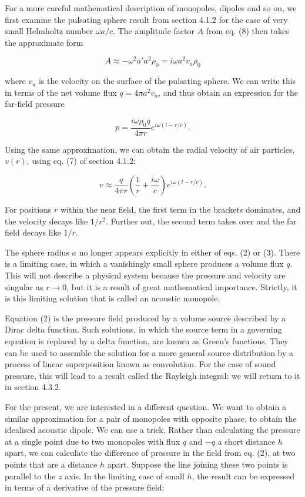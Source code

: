   For a more careful mathematical description of monopoles, dipoles and so on, 
  we first examine the pulsating sphere result from section 4.1.2 for the case 
  of very small Helmholtz number $\omega a/c$. The amplitude factor $A$ from 
  eq. (8) then takes the approximate form 

  $$A \approx -\omega^2 a' a^2 \rho_0 = i \omega a^2 v_a \rho_0 \tag{1}$$ 

  where $v_a$ is the velocity on the surface of the pulsating sphere. We can 
  write this in terms of the net volume flux $q=4 \pi a^2 v_a$, and thus obtain 
  an expression for the far-field pressure 

  $$p=\dfrac{i \omega \rho_0 q}{4 \pi r} e^{i \omega(t-r/c)} . \tag{2}$$ 

  Using the same approximation, we can obtain the radial velocity of air 
  particles, $v(r)$, using eq. (7) of section 4.1.2: 

  $$v \approx \dfrac{q}{4 \pi r} \left( \dfrac{1}{r} + \dfrac{i \omega}{c} 
  \right) e^{i \omega(t-r/c)} . \tag{3}$$ 

  For positions $r$ within the near field, the first term in the brackets 
  dominates, and the velocity decays like $1/r^2$. Further out, the second term 
  takes over and the far field decays like $1/r$. 

  The sphere radius $a$ no longer appears explicitly in either of eqs. (2) or 
  (3). There is a limiting case, in which a vanishingly small sphere produces a 
  volume flux $q$. This will not describe a physical system because the 
  pressure and velocity are singular as $r \rightarrow 0$, but it is a result 
  of great mathematical importance. Strictly, it is this limiting solution that 
  is called an acoustic monopole. 

  Equation (2) is the pressure field produced by a volume source described by a 
  Dirac delta function. Such solutions, in which the source term in a governing 
  equation is replaced by a delta function, are known as Green's functions. 
  They can be used to assemble the solution for a more general source 
  distribution by a process of linear superposition known as convolution. For 
  the case of sound pressure, this will lead to a result called the Rayleigh 
  integral: we will return to it in section 4.3.2. 

  For the present, we are interested in a different question. We want to obtain 
  a similar approximation for a pair of monopoles with opposite phase, to 
  obtain the idealised acoustic dipole. We can use a trick. Rather than 
  calculating the pressure at a single point due to two monopoles with flux $q$ 
  and $-q$ a short distance $h$ apart, we can calculate the difference of 
  pressure in the field from eq. (2), at two points that are a distance $h$ 
  apart. Suppose the line joining these two points is parallel to the $z$ axis. 
  In the limiting case of small $h$, the result can be expressed in terms of a 
  derivative of the pressure field: 

